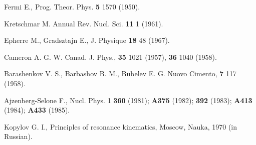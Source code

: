 \begin{thebibliography}{599}

 Fermi E., Prog. Theor. Phys. {\bf 5} 1570 (1950).

 Kretschmar M. Annual Rev. Nucl. Sci. {\bf 11} 1 (1961).

 Epherre M., Gradsztajn E., J. Physique {\bf 18} 48 (1967).

  Cameron A. G. W. Canad. J. Phys., {\bf 35} 1021 (1957), 
{\bf 36} 1040 (1958).

 Barashenkov V. S., Barbashov B. M., Bubelev E. G. Nuovo 
Cimento, {\bf 7} 117 (1958).

 Ajzenberg-Selone F., Nucl. Phys. 1 {\bf 360} (1981); 
{\bf A375} (1982); {\bf 392} (1983); {\bf A413} (1984); {\bf A433} (1985).

 Kopylov G. I., Principles of resonance kinematics, 
Moscow, Nauka, 1970 (in Russian).

\end{thebibliography}
